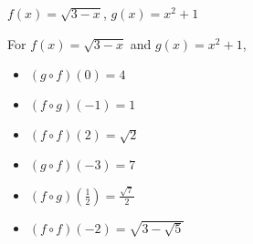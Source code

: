 {$f(x) = \sqrt{3-x}$, $g(x) = x^2+1$}
{For $f(x) = \sqrt{3-x}$ and $g(x) = x^2+1$,
\begin{multicols}{2}

\begin{itemize}

\item  $(g\circ f)(0) = 4$

\item  $(f\circ g)(-1) = 1$

\item  $(f \circ f)(2) = \sqrt{2}$

\item  $(g\circ f)(-3) = 7$

\item  $(f\circ g)\left(\frac{1}{2}\right) = \frac{\sqrt{7}}{2}$


\item  $(f \circ f)(-2) = \sqrt{3 - \sqrt{5}}$

\end{itemize}

\end{multicols}
}
